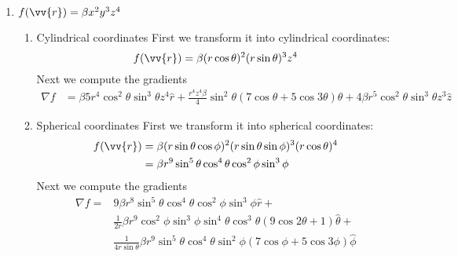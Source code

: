 \documentclass{article}
\begin{document}
\begin{enumerate}
\begin{enumerate}
        \item $f(\vv{r}) = \beta x^2y^3z^4$
        \begin{enumerate}
            \item Cylindrical coordinates
            First we transform it into cylindrical coordinates:
            \[
            f(\vv{r}) = \beta (r\cos\theta)^2(r\sin\theta)^3z^4
            \]
            Next we compute the gradients
            \begin{align*}
            \nabla f &= \beta 5r^4 \cos^2\theta \sin^3\theta z^4 \hat{r} + \frac{r^4z^4\beta}{4} \sin^2\theta(7\cos\theta+5\cos3\theta) \hat{\theta} + 4\beta r^5 \cos^2\theta\sin^3\theta z^3 \hat{z}
            \end{align*}
            \item Spherical coordinates 
            First we transform it into spherical coordinates:
            \begin{align*}
                f(\vv{r}) &= \beta (r\sin\theta\cos\phi)^2(r\sin\theta\sin\phi)^3(r\cos\theta)^4 \\
                &= \beta r^9\sin^5\theta\cos^4\theta\cos^2\phi\sin^3\phi
            \end{align*}
            Next we compute the gradients
            \begin{align*}
            \nabla f = &9\beta r^8\sin^5\theta\cos^4\theta\cos^2\phi\sin^3\phi \hat{r} + \\
            &\frac{1}{2r}\beta r^9\cos^2\phi\sin^3\phi\sin^4\theta\cos^3\theta(9\cos2\theta + 1) \hat{\theta} + \\
            &\frac{1}{4r\sin\theta}\beta r^9\sin^5\theta\cos^4\theta\sin^2\phi(7\cos\phi+5\cos3\phi)\hat{\phi}
            \end{align*}
        \end{enumerate}


\end{enumerate}
\end{enumerate}
\end{document}
